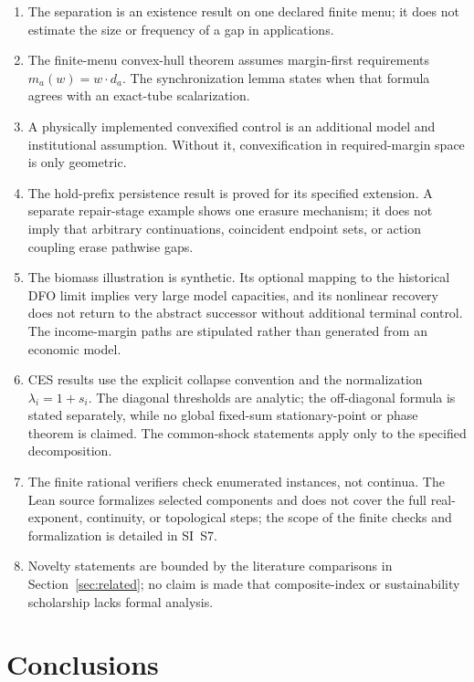 \begin{enumerate}[label=(\roman*),leftmargin=2em]
\item The separation is an existence result on one declared finite menu; it does not estimate the size or frequency of a gap in applications.
\item The finite-menu convex-hull theorem assumes margin-first requirements $m_a(w)=w\cdot d_a$. The synchronization lemma states when that formula agrees with an exact-tube scalarization.
\item A physically implemented convexified control is an additional model and institutional assumption. Without it, convexification in required-margin space is only geometric.
\item The hold-prefix persistence result is proved for its specified extension. A separate repair-stage example shows one erasure mechanism; it does not imply that arbitrary continuations, coincident endpoint sets, or action coupling erase pathwise gaps.
\item The biomass illustration is synthetic. Its optional mapping to the historical DFO limit implies very large model capacities, and its nonlinear recovery does not return to the abstract successor without additional terminal control. The income-margin paths are stipulated rather than generated from an economic model.
\item CES results use the explicit collapse convention and the normalization $\lambda_i=1+s_i$. The diagonal thresholds are analytic; the off-diagonal formula is stated separately, while no global fixed-sum stationary-point or phase theorem is claimed. The common-shock statements apply only to the specified decomposition.
\item The finite rational verifiers check enumerated instances, not continua. The Lean source formalizes selected components and does not cover the full real-exponent, continuity, or topological steps; the scope of the finite checks and formalization is detailed in SI~S7.
\item Novelty statements are bounded by the literature comparisons in Section~\ref{sec:related}; no claim is made that composite-index or sustainability scholarship lacks formal analysis.
\end{enumerate}

\section{Conclusions}\label{sec:conclusions}

